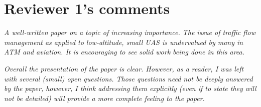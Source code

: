 \documentclass[submit]{aiaa-pretty}
\begin{document}
\section{Reviewer 1's comments}

\textit{A well-written paper on a topic of increasing importance.  The issue of traffic flow management as applied to low-altitude, small UAS is undervalued by many in ATM and aviation.  It is encouraging to see solid work being done in this area.}

\textit{Overall the presentation of the paper is clear.  However, as a reader, I was left with several (small) open questions.  Those questions need not be deeply answered by the paper, however, I think addressing them explicitly (even if to state they will not be detailed) will provide a more complete feeling to the paper.}
\end{document}
